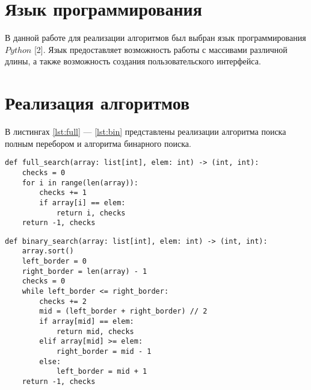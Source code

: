 \documentclass{bmstu}
\begin{document}
\section{Язык программирования}
В данной работе для реализации алгоритмов был выбран язык программирования $Python$ [2]. Язык предоставляет возможность работы с массивами различной длины, а также возможность создания пользовательского интерфейса.

\section{Реализация алгоритмов}

В листингах \ref{lst:full} --- \ref{lst:bin} представлены реализации алгоритма поиска полным перебором и алгоритма бинарного поиска.

\clearpage

\begin{center}
\captionsetup{justification=raggedright,singlelinecheck=off}
\begin{lstlisting}[label=lst:full,caption=Реализация алгоритма поиска полным перебором]
def full_search(array: list[int], elem: int) -> (int, int):
    checks = 0
    for i in range(len(array)):
        checks += 1
        if array[i] == elem:
            return i, checks
    return -1, checks
\end{lstlisting}
\end{center}

\begin{center}
\captionsetup{justification=raggedright,singlelinecheck=off}
\begin{lstlisting}[label=lst:bin,caption=Реализация алгоритма бинарного поиска в массиве]
def binary_search(array: list[int], elem: int) -> (int, int):
    array.sort()
    left_border = 0
    right_border = len(array) - 1
    checks = 0
    while left_border <= right_border:
        checks += 2
        mid = (left_border + right_border) // 2
        if array[mid] == elem:
            return mid, checks
        elif array[mid] >= elem:
            right_border = mid - 1
        else:
            left_border = mid + 1
    return -1, checks
\end{lstlisting}
\end{center}

\clearpage
\end{document}
